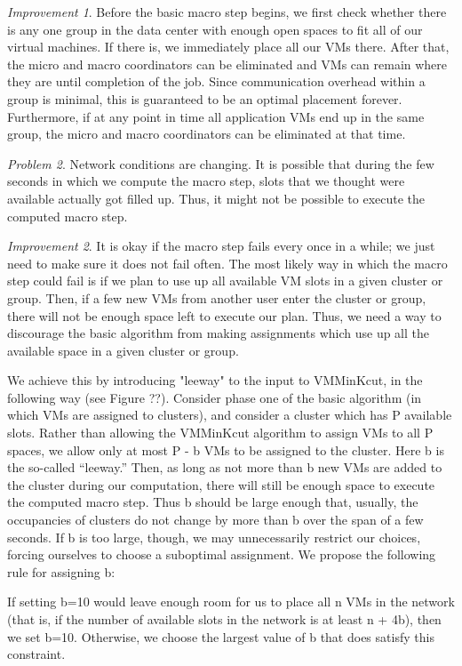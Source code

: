 \documentclass[11pt]{article}
\begin{document}
\textit{Improvement 1}. Before the basic macro step begins, we first check whether there is any one group in the data center with enough open spaces to fit all of our virtual machines.  If there is, we immediately place all our VMs there.  After that, the micro and macro coordinators can be eliminated and VMs can remain where they are until completion of the job.  Since communication overhead within a group is minimal, this is guaranteed to be an optimal placement forever.  Furthermore, if at any point in time all application VMs end up in the same group, the micro and macro coordinators can be eliminated at that time.

\textit{Problem 2}. Network conditions are changing.  It is possible that during the few seconds in which we compute the macro step, slots that we thought were available actually got filled up.  Thus, it might not be possible to execute the computed macro step.

\textit{Improvement 2}. It is okay if the macro step fails every once in a while; we just need to make sure it does not fail often.  The most likely way in which the macro step could fail is if we plan to use up all available VM slots in a given cluster or group.  Then, if a few new VMs from another user enter the cluster or group, there will not be enough space left to execute our plan.  Thus, we need a way to discourage the basic algorithm from making assignments which use up all the available space in a given cluster or group.

We achieve this by introducing "leeway" to the input to VMMinKcut, in the following way (see Figure ??).  Consider phase one of the basic algorithm (in which VMs are assigned to clusters), and consider a cluster which has P available slots.  Rather than allowing the VMMinKcut algorithm to assign VMs to all P spaces, we allow only at most P - b VMs to be assigned to the cluster.  Here b is the so-called “leeway.”  Then, as long as not more than b new VMs are added to the cluster during our computation, there will still be enough space to execute the computed macro step.  Thus b should be large enough that, usually, the occupancies of clusters do not change by more than b over the span of a few seconds.  If b is too large, though, we may unnecessarily restrict our choices, forcing ourselves to choose a suboptimal assignment.  We propose the following rule for assigning b:

If setting b=10 would leave enough room for us to place all n VMs in the network (that is, if the number of available slots in the network is at least n + 4b), then we set b=10.  Otherwise, we choose the largest value of b that does satisfy this constraint.
\end{document}
